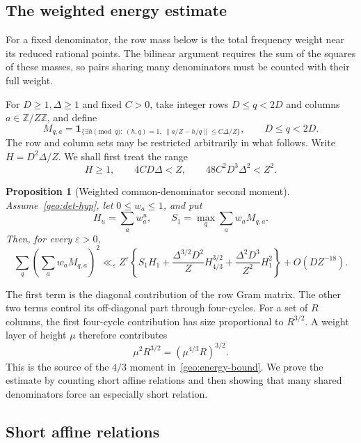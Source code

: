 \documentclass[11pt,a4paper]{article}
\theoremstyle{paperplain}
\newtheorem{proposition}[theorem]{Proposition}
\numberwithin{equation}{section}
\begin{document}
\subsection{The weighted energy estimate}

For a fixed denominator, the row mass below is the total frequency weight
near its reduced rational points. The bilinear argument requires the sum
of the squares of these masses, so pairs sharing many denominators must
be counted with their full weight.

For $D\ge1,\Delta\ge1$ and fixed $C>0$, take integer rows
$D\le q<2D$ and columns $a\in\mathbb Z/Z\mathbb Z$, and define
\begin{equation}\label{geo:incidence-matrix}
 M_{q,a}=\mathbf1_{\{\exists h\pmod q:\ (h,q)=1,
       \ \|a/Z-h/q\|\le C\Delta/Z\}},\qquad D\le q<2D.
\end{equation}
The row and column sets may be restricted arbitrarily in what follows.
Write $H=D^2\Delta/Z$.
We shall first treat the range
\begin{equation}\label{geo:det-hyp}
 H\ge1,\qquad 4CD\Delta<Z,\qquad
 48C^2D^3\Delta^2<Z^2.
\end{equation}

\begin{proposition}[Weighted common-denominator second moment]\label{geo:energy}
Assume~\eqref{geo:det-hyp}, let $0\le w_a\le1$, and put
\[
 H_u=\sum_aw_a^u,\qquad S_1=\max_q\sum_aw_aM_{q,a}.
\]
Then, for every $\varepsilon>0$,
\begin{equation}\label{geo:energy-bound}
 \sum_q\left(\sum_aw_aM_{q,a}\right)^2
 \ll_\varepsilon Z^\varepsilon\left\{
 S_1H_1+\frac{\Delta^{3/2}D^2}{Z}H_{4/3}^{3/2}
 +\frac{\Delta^2D^3}{Z^2}H_1^2\right\}+O(DZ^{-18}).
\end{equation}
\end{proposition}

The first term is the diagonal contribution of the row Gram matrix.
The other two terms control its off-diagonal part through four-cycles. For a set
of $R$ columns, the first four-cycle contribution has size proportional
to $R^{3/2}$. A weight layer of height $\mu$ therefore contributes
\[
 \mu^2R^{3/2}=(\mu^{4/3}R)^{3/2}.
\]
This is the source of the $4/3$ moment in~\eqref{geo:energy-bound}.
We prove the estimate by counting short affine relations and then showing
that many shared denominators force an especially short relation.

\subsection{Short affine relations}
\end{document}
